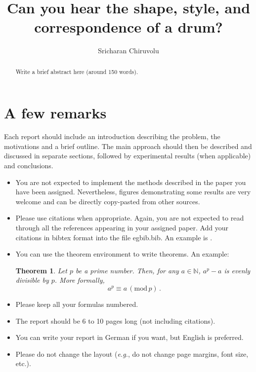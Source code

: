 \documentclass[a4paper,10pt]{article}
\title{Can you hear the shape, style, and correspondence of a drum?}
\author{Sricharan Chiruvolu} %
\institute{Department of Informatics - Technische Universit\"{a}t M\"{u}nchen} %
\newtheorem{theorem}{Theorem}
\begin{document}
\maketitle

\begin{abstract}
Write a brief abstract here (around 150 words).
\end{abstract}

\section{A few remarks}

Each report should include an introduction describing the problem, the motivations and a brief outline. The main approach should then be described and discussed in separate sections, followed by experimental results (when applicable) and conclusions.

\begin{itemize}
\item You are not expected to implement the methods described in the paper you have been assigned. Nevertheless, figures demonstrating some results are very welcome and can be directly copy-pasted from other sources.
\item Please use citations when appropriate. Again, you are not expected to read through all the references appearing in your assigned paper. Add your citations in bibtex format into the file egbib.bib. An example is \cite{dijkstra59}.
\item You can use the theorem environment to write theorems. An example:
\begin{theorem}
\label{mytheorem}
Let $p$ be a prime number. Then, for any $a \in \mathbb{N}$, $a^p - a$ is evenly divisible by $p$. More formally,
\begin{equation}
a^p \equiv a \, (\mathrm{mod}\, p)\,.
\end{equation}
\end{theorem}
\item Please keep all your formulas numbered.
\item The report should be 6 to 10 pages long (not including citations).
\item You can write your report in German if you want, but English is preferred.
\item Please do not change the layout ({\em e.g.}, do not change page margins, font size, etc.).
\end{itemize}
	


\end{document}
